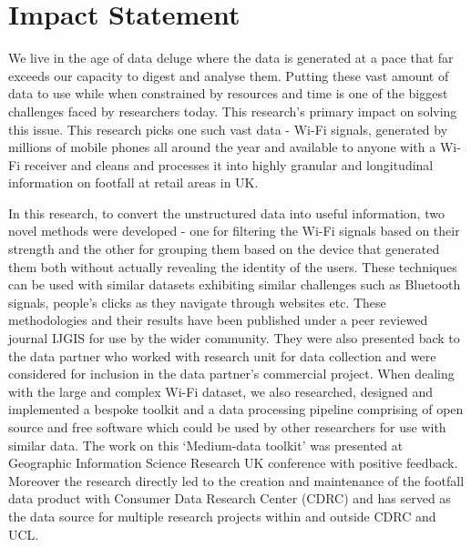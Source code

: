 \section*{Impact Statement}

We live in the age of data deluge where the data is generated at a pace that far exceeds our capacity to digest and analyse them.
Putting these vast amount of data to use while when constrained by resources and time is one of the biggest challenges faced by researchers today.
This research's primary impact on solving this issue.
This research picks one such vast data - Wi-Fi signals, generated by millions of mobile phones all around the year and available to anyone with a Wi-Fi receiver and cleans and processes it into highly granular and longitudinal information on footfall at retail areas in UK.

In this research, to convert the unstructured data into useful information, two novel methods were developed - one for filtering the Wi-Fi signals based on their strength and the other for grouping them based on the device that generated them both without actually revealing the identity of the users.
These techniques can be used with similar datasets exhibiting similar challenges such as Bluetooth signals, people's clicks as they navigate through websites etc.
These methodologies and their results have been published under a peer reviewed journal IJGIS for use by the wider community.
They were also presented back to the data partner who worked with research unit for data collection and were considered for inclusion in the data partner's commercial project.
When dealing with the large and complex Wi-Fi dataset, we also researched, designed and implemented a bespoke toolkit and a data processing pipeline comprising of open source and free software which could be used by other researchers for use with similar data.
The work on this `Medium-data toolkit' was presented at Geographic Information Science Research UK conference with positive feedback.
Moreover the research directly led to the creation and maintenance of the footfall data product with Consumer Data Research Center (CDRC) and has served as the data source for multiple research projects within and outside CDRC and UCL.

